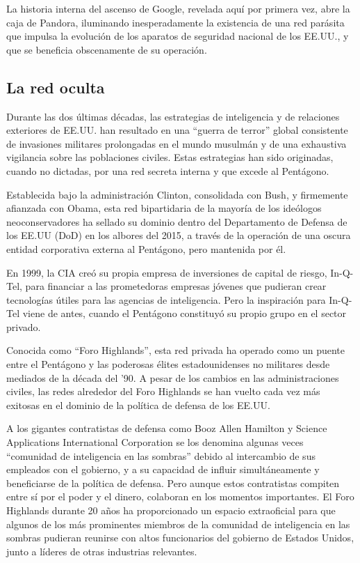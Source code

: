 \documentclass[10pt,a5paper,twoside,spanish,]{book}
\begin{document}
La historia interna del ascenso de Google, revelada aquí por primera
vez, abre la caja de Pandora, iluminando inesperadamente la existencia
de una red parásita que impulsa la evolución de los aparatos de
seguridad nacional de los EE.UU., y que se beneficia obscenamente de su
operación.

\subsection{La red oculta}\label{la-red-oculta}

Durante las dos últimas décadas, las estrategias de inteligencia y de
relaciones exteriores de EE.UU. han resultado en una ``guerra de
terror'' global consistente de invasiones militares prolongadas en el
mundo musulmán y de una exhaustiva vigilancia sobre las poblaciones
civiles. Estas estrategias han sido originadas, cuando no dictadas, por
una red secreta interna y que excede al Pentágono.

Establecida bajo la administración Clinton, consolidada con Bush, y
firmemente afianzada con Obama, esta red bipartidaria de la mayoría de
los ideólogos neoconservadores ha sellado su dominio dentro del
Departamento de Defensa de los EE.UU (DoD) en los albores del 2015, a
través de la operación de una oscura entidad corporativa externa al
Pentágono, pero mantenida por él.

En 1999, la CIA creó su propia empresa de inversiones de capital de
riesgo, In-Q-Tel, para financiar a las prometedoras empresas jóvenes que
pudieran crear tecnologías útiles para las agencias de inteligencia.
Pero la inspiración para In-Q-Tel viene de antes, cuando el Pentágono
constituyó su propio grupo en el sector privado.

Conocida como ``Foro Highlands'', esta red privada ha operado como un
puente entre el Pentágono y las poderosas élites estadounidenses no
militares desde mediados de la década del '90. A pesar de los cambios en
las administraciones civiles, las redes alrededor del Foro Highlands se
han vuelto cada vez más exitosas en el dominio de la política de defensa
de los EE.UU.

A los gigantes contratistas de defensa como Booz Allen Hamilton y
Science Applications International Corporation se los denomina algunas
veces ``comunidad de inteligencia en las sombras'' debido al intercambio
de sus empleados con el gobierno, y a su capacidad de influir
simultáneamente y beneficiarse de la política de defensa. Pero aunque
estos contratistas compiten entre sí por el poder y el dinero, colaboran
en los momentos importantes. El Foro Highlands durante 20 años ha
proporcionado un espacio extraoficial para que algunos de los más
prominentes miembros de la comunidad de inteligencia en las sombras
pudieran reunirse con altos funcionarios del gobierno de Estados Unidos,
junto a líderes de otras industrias relevantes.
\end{document}
